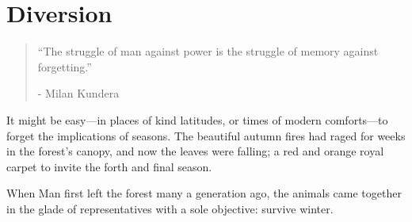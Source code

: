 \chapter{Diversion}

\vspace{-1.3cm}
\begin{localsize}{10}
	\begin{quote}
		“The struggle of man against power is the struggle of memory against forgetting.”
		\begin{flushright}- Milan Kundera \end{flushright}
	\end{quote} 
\end{localsize}
\vspace{1cm}

It might be easy---in places of kind latitudes, or times of modern comforts---to forget the implications of seasons. The beautiful autumn fires had raged for weeks in the forest's canopy, and now the leaves were falling; a red and orange royal carpet to invite the forth and final season.

When Man first left the forest many a generation ago, the animals came together in the glade of representatives with a sole objective: survive winter.   
